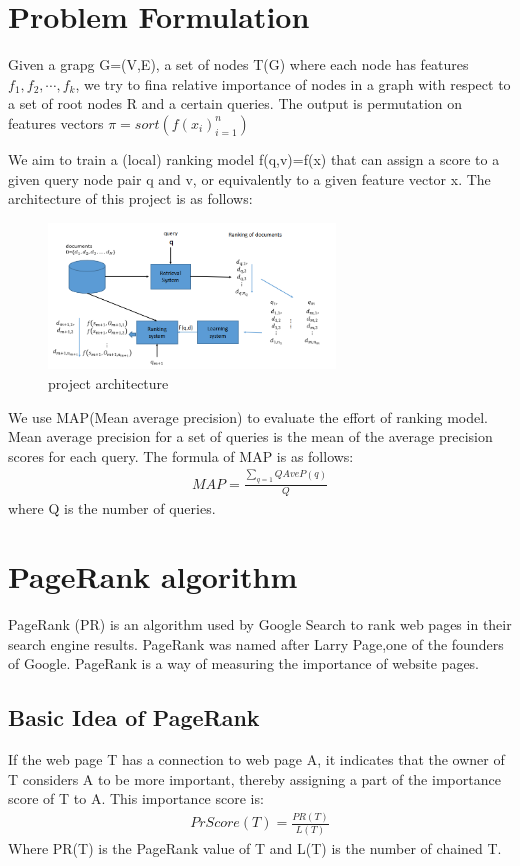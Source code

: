 \documentclass{acmtog} %
\begin{document}
\section{Problem Formulation}
Given a grapg G=(V,E), a set of nodes T(G) where each node has features $f_1,f_2,\cdots, f_k$, we try to fina relative importance of nodes in a graph with respect to a set of root nodes R and a certain queries. The output is permutation on features vectors $\pi=sort({f(x_i)}_{i=1}^n)$

We aim to train a (local) ranking model f(q,v)=f(x) that can assign a score to a given query node pair q and v, or equivalently to a given feature vector x. The architecture of this project is as follows:
\begin{figure}[htbp]
    \centering
    \includegraphics[width = 3in]{1.png}
    \caption{project architecture}
    \label{fig:my_label}
\end{figure}
We use MAP(Mean average precision) \cite{ref6} to evaluate the effort of ranking model. Mean average precision for a set of queries is the mean of the average precision scores for each query. The formula of MAP is as follows:
\begin{eqnarray}
  MAP=\frac{\sum_{q=1}{Q}AveP(q)}{Q}
  \label{eq:MAP_formula}
\end{eqnarray}  
where Q is the number of queries.

\section{PageRank algorithm}
PageRank (PR) is an algorithm used by Google Search to rank web pages in their search engine results. PageRank was named after Larry Page,one of the founders of Google. PageRank is a way of measuring the importance of website pages.
\subsection{Basic Idea of PageRank}
If the web page T has a connection to web page A, it indicates that the owner of T considers A to be more important, thereby assigning a part of the importance score of T to A. This importance score is:
\begin{eqnarray}
  PrScore(T)= \frac{PR(T)}{L(T)}
  \label{eq:importance_Score}
\end{eqnarray}    
Where PR(T) is the PageRank value of T and L(T) is the number of chained T.
\end{document}
